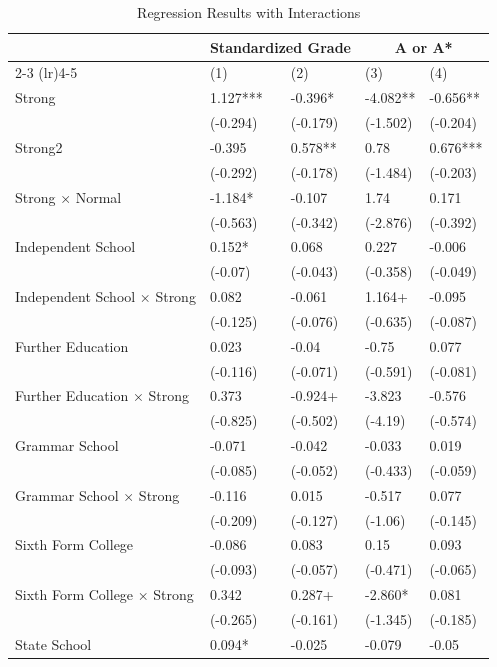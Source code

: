 \begin{table}[ht]
\centering
\caption{Regression Results with Interactions}
\begin{threeparttable}
\begin{tabular}{lllll}
\toprule
& \multicolumn{2}{c}{Standardized Grade} & \multicolumn{2}{c}{A or A*} \\
\cmidrule(lr){2-3} \cmidrule(lr){4-5} 
 & (1)       & (2)       & (3)     & (4) \\
\midrule
Strong & 1.127*** & -0.396* & -4.082** & -0.656** \\
 & (-0.294) & (-0.179) & (-1.502) & (-0.204) \\
Strong2 & -0.395 & 0.578** & 0.78 & 0.676*** \\
 & (-0.292) & (-0.178) & (-1.484) & (-0.203) \\
Strong × Normal & -1.184* & -0.107 & 1.74 & 0.171 \\
 & (-0.563) & (-0.342) & (-2.876) & (-0.392) \\
Independent School & 0.152* & 0.068 & 0.227 & -0.006 \\
 & (-0.07) & (-0.043) & (-0.358) & (-0.049) \\
Independent School × Strong & 0.082 & -0.061 & 1.164+ & -0.095 \\
 & (-0.125) & (-0.076) & (-0.635) & (-0.087) \\
Further Education & 0.023 & -0.04 & -0.75 & 0.077 \\
 & (-0.116) & (-0.071) & (-0.591) & (-0.081) \\
Further Education × Strong & 0.373 & -0.924+ & -3.823 & -0.576 \\
 & (-0.825) & (-0.502) & (-4.19) & (-0.574) \\
Grammar School & -0.071 & -0.042 & -0.033 & 0.019 \\
 & (-0.085) & (-0.052) & (-0.433) & (-0.059) \\
Grammar School × Strong & -0.116 & 0.015 & -0.517 & 0.077 \\
 & (-0.209) & (-0.127) & (-1.06) & (-0.145) \\
Sixth Form College & -0.086 & 0.083 & 0.15 & 0.093 \\
 & (-0.093) & (-0.057) & (-0.471) & (-0.065) \\
Sixth Form College × Strong & 0.342 & 0.287+ & -2.860* & 0.081 \\
 & (-0.265) & (-0.161) & (-1.345) & (-0.185) \\
State School & 0.094* & -0.025 & -0.079 & -0.05 \\

\end{tabular}
\end{threeparttable}
\end{table}
